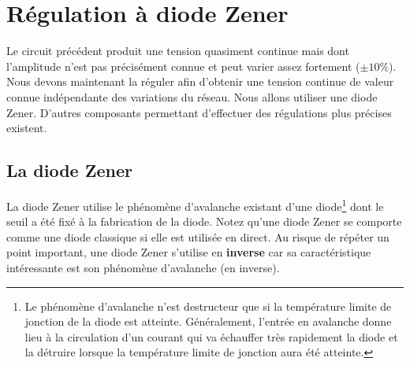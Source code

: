 \documentclass{../template/labo}
\begin{document}
\newpage
\section{Régulation à diode Zener}
Le circuit précédent produit une tension quasiment continue mais dont l'amplitude n'est pas précisément connue et peut varier assez fortement ($\pm 10\%$). Nous devons maintenant la réguler afin d'obtenir une tension continue de valeur connue indépendante des variations du réseau. Nous allons utiliser une diode Zener. D'autres composants permettant d'effectuer des régulations plus précises existent.

\subsection{La diode Zener}%

La diode Zener utilise le phénomène d'avalanche existant d'une diode\footnote{Le phénomène d'avalanche n'est destructeur que si la température limite de jonction de la diode est atteinte. Généralement, l'entrée en avalanche donne lieu à la circulation d'un courant qui va échauffer très rapidement la diode et la détruire lorsque la température limite de jonction aura été atteinte.} dont le seuil a été fixé à la fabrication de la diode. Notez qu'une diode Zener  se comporte comme une diode classique si elle est utilisée en direct. Au risque de répéter un point important, une diode Zener s'utilise en \textbf{inverse} car sa caractéristique intéressante est son phénomène d'avalanche (en inverse).
\end{document}
